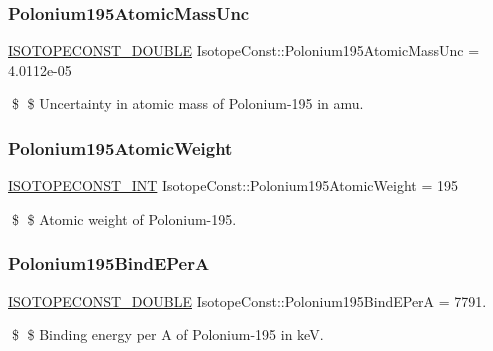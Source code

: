 \subsubsection{\texorpdfstring{Polonium195\+Atomic\+Mass\+Unc}{Polonium195AtomicMassUnc}}
{\footnotesize\ttfamily \mbox{\hyperlink{group___isotope_const-_macros_ga8f45a7272ce02c0b4c65c44636ed719a}{I\+S\+O\+T\+O\+P\+E\+C\+O\+N\+S\+T\+\_\+\+D\+O\+U\+B\+LE}} Isotope\+Const\+::\+Polonium195\+Atomic\+Mass\+Unc = 4.\+0112e-\/05}

\$ \$ Uncertainty in atomic mass of Polonium-\/195 in amu. \mbox{\label{group___isotope_const-_polonium-_po195_ga39da9b17eabfef9bde3604ae85f47f5e}} 
\subsubsection{\texorpdfstring{Polonium195\+Atomic\+Weight}{Polonium195AtomicWeight}}
{\footnotesize\ttfamily \mbox{\hyperlink{group___isotope_const-_macros_ga5f18360b3e99483a35c32d789e62621c}{I\+S\+O\+T\+O\+P\+E\+C\+O\+N\+S\+T\+\_\+\+I\+NT}} Isotope\+Const\+::\+Polonium195\+Atomic\+Weight = 195}

\$ \$ Atomic weight of Polonium-\/195. \mbox{\label{group___isotope_const-_polonium-_po195_gaf39d9f7d25ce7554eb5db1b55817810c}} 
\subsubsection{\texorpdfstring{Polonium195\+Bind\+E\+PerA}{Polonium195BindEPerA}}
{\footnotesize\ttfamily \mbox{\hyperlink{group___isotope_const-_macros_ga8f45a7272ce02c0b4c65c44636ed719a}{I\+S\+O\+T\+O\+P\+E\+C\+O\+N\+S\+T\+\_\+\+D\+O\+U\+B\+LE}} Isotope\+Const\+::\+Polonium195\+Bind\+E\+PerA = 7791.}

\$ \$ Binding energy per A of Polonium-\/195 in keV. \mbox{\label{group___isotope_const-_polonium-_po195_gabad8ca4e349bb415260ef96c7a3420f9}} 
